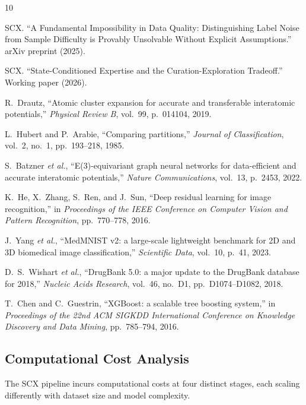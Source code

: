 \begin{thebibliography}{10}

SCX. ``A Fundamental Impossibility in Data Quality: Distinguishing Label Noise from Sample Difficulty is Provably Unsolvable Without Explicit Assumptions.'' arXiv preprint (2025).

SCX. ``State-Conditioned Expertise and the Curation-Exploration Tradeoff.'' Working paper (2026).

R.~Drautz, ``Atomic cluster expansion for accurate and transferable interatomic potentials,'' \textit{Physical Review B}, vol.~99, p.~014104, 2019.

L.~Hubert and P.~Arabie, ``Comparing partitions,'' \textit{Journal of Classification}, vol.~2, no.~1, pp.~193--218, 1985.

S.~Batzner \textit{et al.}, ``E(3)-equivariant graph neural networks for data-efficient and accurate interatomic potentials,'' \textit{Nature Communications}, vol.~13, p.~2453, 2022.

K.~He, X.~Zhang, S.~Ren, and J.~Sun, ``Deep residual learning for image recognition,'' in \textit{Proceedings of the IEEE Conference on Computer Vision and Pattern Recognition}, pp.~770--778, 2016.

J.~Yang \textit{et al.}, ``MedMNIST v2: a large-scale lightweight benchmark for 2D and 3D biomedical image classification,'' \textit{Scientific Data}, vol.~10, p.~41, 2023.

D.~S.~Wishart \textit{et al.}, ``DrugBank 5.0: a major update to the DrugBank database for 2018,'' \textit{Nucleic Acids Research}, vol.~46, no.~D1, pp.~D1074--D1082, 2018.

T.~Chen and C.~Guestrin, ``XGBoost: a scalable tree boosting system,'' in \textit{Proceedings of the 22nd ACM SIGKDD International Conference on Knowledge Discovery and Data Mining}, pp.~785--794, 2016.

\end{thebibliography}

\subsection{Computational Cost Analysis}

The SCX pipeline incurs computational costs at four distinct stages, each scaling differently with dataset size and model complexity.


